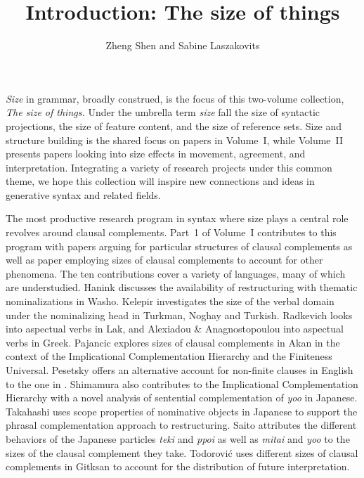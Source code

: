 \documentclass[output=paper]{langscibook}
\author{Zheng Shen\affiliation{National University of Singapore} and Sabine Laszakovits\affiliation{Austrian Academy of Sciences; University of Connecticut}}
\title{Introduction: The size of things}
\begin{document}
\maketitle

\noindent\textit{Size} in grammar, broadly construed, is the focus of this two-volume collection, \textit{The size of things.}
Under the umbrella term \textit{size} fall the size of syntactic projections, the size of feature content, and the size of  reference sets. 
Size and structure building is the shared focus on papers in Volume~I, while Volume~II presents papers looking into size effects in movement, agreement, and interpretation. 
Integrating a variety of research projects under this common theme, we hope this collection will inspire new connections and ideas in generative syntax and related fields. 

The most productive research program in syntax where size plays a central role revolves around clausal complements. 
Part~1 of Volume~I contributes to this program with papers arguing for particular structures of clausal complements as well as paper employing sizes of clausal complements to account for other phenomena. 
The ten contributions cover a variety of languages, many of which are understudied. 
Hanink discusses the availability of restructuring with thematic nominalizations in Washo. 
Kelepir investigates the size of the verbal domain under the nominalizing head in Turkman, Noghay and Turkish. 
Radkevich looks into aspectual verbs in Lak, and Alexiadou \& Anagnostopoulou into aspectual verbs in Greek.
Pajancic explores sizes of clausal complements in Akan in the context of the Implicational Complementation Hierarchy and the Finiteness Universal. 
Pesetsky offers an alternative account for non-finite clauses in English to the one in \cite{Wurmbrand:2014}.
Shimamura also contributes to the Implicational Complementation Hierarchy with a novel analysis of sentential complementation of \textit{yoo} in Japanese. 
Takahashi uses scope properties of nominative objects in Japanese to support the phrasal complementation approach to restructuring. 
Saito attributes the different behaviors of the Japanese particles \textit{teki} and \textit{ppoi} as well as \textit{mitai} and \textit{yoo} to the sizes of the clausal complement they take.
Todorović uses different sizes of clausal complements in Gitksan to account for the distribution of future interpretation. 
\end{document}
